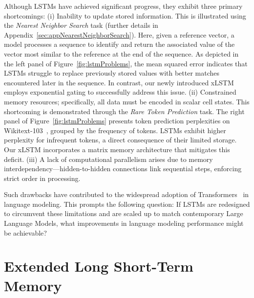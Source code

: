 Although LSTMs have achieved significant progress, they exhibit three primary shortcomings: (i) Inability to update stored information. This is illustrated using the {\it Nearest Neighbor Search} task (further details in Appendix~\ref{sec:appNearestNeighborSearch}). Here, given a reference vector, a model processes a sequence to identify and return the associated value of the vector most similar to the reference at the end of the sequence. As depicted in the left panel of Figure~\ref{fig:lstmProblems}, the mean squared error indicates that LSTMs struggle to replace previously stored values with better matches encountered later in the sequence. In contrast, our newly introduced xLSTM employs exponential gating to successfully address this issue. (ii) Constrained memory resources; specifically, all data must be encoded in scalar cell states. This shortcoming is demonstrated through the {\it Rare Token Prediction} task. The right panel of Figure~\ref{fig:lstmProblems} presents token prediction perplexities on Wikitext-103~\citep{Merity:17}, grouped by the frequency of tokens. LSTMs exhibit higher perplexity for infrequent tokens, a direct consequence of their limited storage. Our xLSTM incorporates a matrix memory architecture that mitigates this deficit. (iii) A lack of computational parallelism arises due to memory interdependency—hidden-to-hidden connections link sequential steps, enforcing strict order in processing.

Such drawbacks have contributed to the widespread adoption of Transformers~\citep{Vaswani:17} in language modeling. This prompts the following question: If LSTMs are redesigned to circumvent these limitations and are scaled up to match contemporary Large Language Models, what improvements in language modeling performance might be achievable?

\section{Extended Long Short-Term Memory}
\label{sec:xLSTM}

